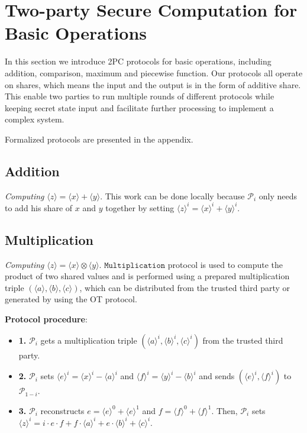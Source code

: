 \documentclass[letterpaper]{article} %
\begin{document}
    \section{Two-party Secure Computation for Basic Operations}

    In this section we introduce 2PC protocols for basic operations,
    including addition, comparison, maximum and piecewise function.
    Our protocols all operate on shares, which means
    the input and the output is in the form of additive share.
    This enable two parties to run multiple rounds of different
    protocols while keeping secret state input
    and facilitate further processing to implement a complex system.

    Formalized protocols are presented in the appendix.

    \subsection{Addition}

    \emph{Computing} $ \langle z\rangle  = \langle x\rangle  + \langle y\rangle $. This work can be done locally because
    $\mathcal{P}_{i}$ only needs to add his share of $x$ and $y$ together by setting $\langle z\rangle^{i}  = \langle x\rangle^{i}  + \langle y\rangle^{i} $.



    \subsection{Multiplication}
    \emph{Computing} $ \langle z\rangle  = \langle x\rangle  \otimes \langle y\rangle $.
    $\mathtt{Multiplication}$ protocol is used to compute the product of two shared values and is performed
    using a prepared multiplication triple $(\langle a\rangle,\langle b\rangle,\langle c\rangle)$,
    which can be distributed from the trusted third party or
    generated by using the OT protocol.

    \textbf{Protocol procedure}:
    \begin{itemize}
        \item \textbf{1.} $\mathcal{P}_{i}$ gets a multiplication triple
        $(\langle a\rangle ^{i},\langle b\rangle ^{i},\langle c\rangle ^{i})$ from the trusted third party.
        \item \textbf{2.} $\mathcal{P}_{i}$ sets $\langle e\rangle ^{i}=\langle x\rangle ^{i}-\langle a\rangle ^{i}$ and $\langle f\rangle ^{i}=\langle y\rangle ^{i}-\langle b\rangle ^{i}$
        and sends $(\langle e\rangle ^{i},\langle f\rangle ^{i})$ to $\mathcal{P}_{1-i}$.
        \item \textbf{3.} $\mathcal{P}_{i}$ reconstructs $e = \langle e\rangle ^{0}+\langle e\rangle ^{1}$ and $f = \langle f\rangle ^{0}+\langle f\rangle ^{1}$.
        Then, $\mathcal{P}_{i}$ sets $\langle z\rangle^{i}=i\cdot e \cdot f + f\cdot \langle a\rangle^{i}+e \cdot \langle b\rangle^{i} + \langle c\rangle^{i}$.

    \end{itemize}
\end{document}
